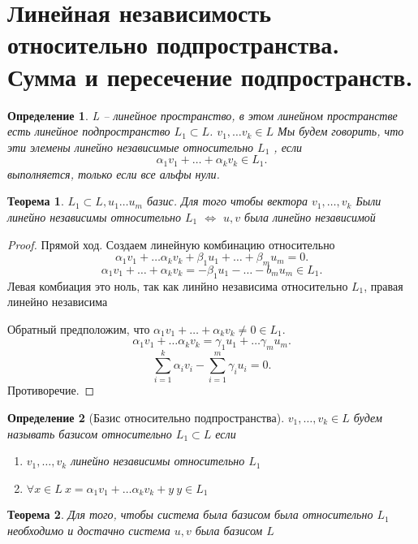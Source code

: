 \documentclass{scrartcl}
\newtheorem{theorem}{Теорема}
\newtheorem{definition}{Определение}
\begin{document}
\section{Линейная независимость относительно подпространства. Сумма и пересечение подпространств.}
\begin{definition}
    L -- линейное пространство, в этом линейном пространстве есть линейное подпространство $L_1 \subset L$. $v_1,\dots v_{k} \in L$ 
    Мы будем говорить, что эти элемены линейно независимые относительно $L_1$ , если
    \[
    \alpha_1 v_1 + \dots + \alpha_{k} v_{k} \in L_1
    .\] 
    выполняется, только если все альфы нули.
\end{definition}
\begin{theorem}
    $L_1 \subset L, u_1\dots u_{m}$ базис. Для того чтобы вектора $v_1,\dots,v_{k}$ 
    Были линейно независимы относительно $L_1$ $\iff$  $u,v$ была линейно независимой
\end{theorem}
\begin{proof}
    Прямой ход. Создаем линейную комбинацию относительно
    \[
    \alpha_1 v_1 + \dots \alpha_{k} v_{k} + \beta_1 u_1 + \dots + \beta_{m} u_{m} = 0
    .\] 
    \[
    \alpha_1 v_1 + \dots + \alpha_{k}v_{k} = -\beta_1 u_1 - \dots - b_{m}u_{m} \in L_1
    .\] 
    Левая комбиация это ноль, так как линйно независима относительно $L_1$, правая линейно независима

    Обратный предположим, что $\alpha_1 v_1 + \dots + \alpha_{k}v_{k} \neq 0 \in L_1$.
    \[
    \alpha_1v_1 + \dots \alpha_{k} v_{k} = \gamma_{1}u_{1} + \dots \gamma_{m}u_{m}
    .\] 
    \[
    \sum_{i=1}^{k}\alpha_{i}v_{i} - \sum_{i = 1}^{m}\gamma_{i} u_{i} = 0
    .\] 
    Противоречие.
\end{proof}
\begin{definition}[Базис относительно подпространства]
    $v_1,\dots,v_{k} \in L$ будем называть базисом относительно $L_1 \subset L$ 
    если 
    \begin{enumerate}
        \item $v_1,\dots ,v_{k}$ линейно независимы относительно $L_1$
        \item $\forall  x \in L  ~ x = \alpha_1v_1 + \dots \alpha_{k}v_{k} + y ~ y\in L_1$
    \end{enumerate}
\end{definition}
\begin{theorem}
    Для того, чтобы система была базисом была относительно $L_1$ необходимо и достачно
    система $u,v$ была базисом  $L$
\end{theorem}
\end{document}
